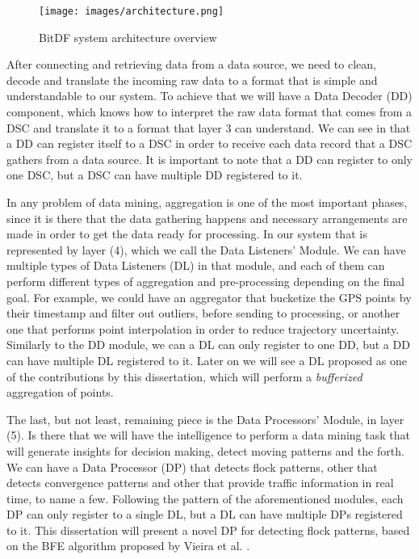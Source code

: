 \begin{figure}[h!]
    \centering
    \caption{BitDF system architecture overview}
    \texttt{[image: images/architecture.png]}
    \label{fig:architecture}
\end{figure}

After connecting and retrieving data from a data source, we need to clean, decode and translate the incoming raw data to
a format that is simple and understandable to our system. To achieve that we will have a Data Decoder (DD) component,
which knows how to interpret the raw data format that comes from a DSC and translate it to a format that layer 3 can
understand. We can see in  that a DD can register itself to a DSC in order to receive each data
record that a DSC gathers from a data source. It is important to note that a DD can register to only one DSC, but a DSC
can have multiple DD registered to it.

In any problem of data mining, aggregation is one of the most important phases, since it is there that the data
gathering happens and necessary arrangements are made in order to get the data ready for processing. In our system that
is represented by layer (4), which we call the Data Listeners' Module. We can have multiple types of Data Listeners (DL)
in that module, and each of them can perform different types of aggregation and pre-processing depending on the final
goal.  For example, we could have an aggregator that bucketize the GPS points by their timestamp and filter out
outliers, before sending to processing, or another one that performs point interpolation in order to reduce trajectory
uncertainty. Similarly to the DD module, we can a DL can only register to one DD, but a DD can have multiple DL
registered to it. Later on we will see a DL proposed as one of the contributions by this dissertation, which will
perform a \textit{bufferized} aggregation of points.

The last, but not least, remaining piece is the Data Processors' Module, in layer (5). Is there that we will have the
intelligence to perform a data mining task that will generate insights for decision making, detect moving patterns and
the forth. We can have a Data Processor (DP) that detects flock patterns, other that detects convergence patterns and
other that provide traffic information in real time, to name a few. Following the pattern of the aforementioned modules,
each DP can only register to a single DL, but a DL can have multiple DPs registered to it. This dissertation will
present a novel DP for detecting flock patterns, based on the BFE algorithm proposed by Vieira et al. \citep{vieira}.

